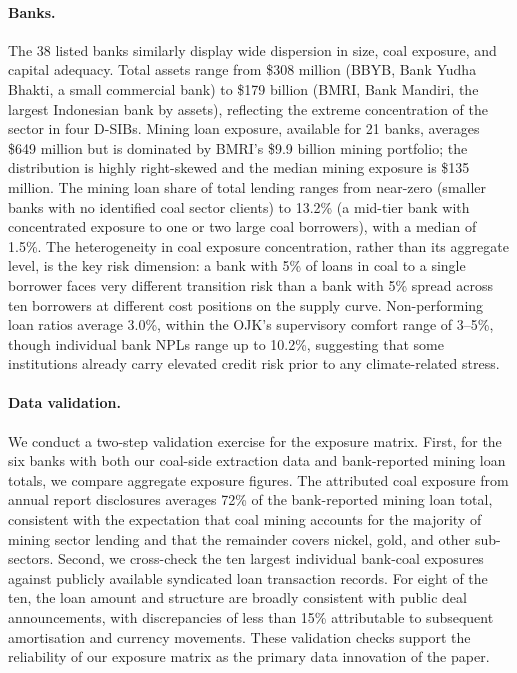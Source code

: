 \paragraph{Banks.} The 38 listed banks similarly display wide dispersion in size, coal exposure, and capital adequacy. Total assets range from \$308 million (BBYB, Bank Yudha Bhakti, a small commercial bank) to \$179 billion (BMRI, Bank Mandiri, the largest Indonesian bank by assets), reflecting the extreme concentration of the sector in four D-SIBs. Mining loan exposure, available for 21 banks, averages \$649 million but is dominated by BMRI's \$9.9 billion mining portfolio; the distribution is highly right-skewed and the median mining exposure is \$135 million. The mining loan share of total lending ranges from near-zero (smaller banks with no identified coal sector clients) to 13.2\% (a mid-tier bank with concentrated exposure to one or two large coal borrowers), with a median of 1.5\%. The heterogeneity in coal exposure concentration, rather than its aggregate level, is the key risk dimension: a bank with 5\% of loans in coal to a single borrower faces very different transition risk than a bank with 5\% spread across ten borrowers at different cost positions on the supply curve. Non-performing loan ratios average 3.0\%, within the OJK's supervisory comfort range of 3--5\%, though individual bank NPLs range up to 10.2\%, suggesting that some institutions already carry elevated credit risk prior to any climate-related stress.

\paragraph{Data validation.} We conduct a two-step validation exercise for the exposure matrix. First, for the six banks with both our coal-side extraction data and bank-reported mining loan totals, we compare aggregate exposure figures. The attributed coal exposure from annual report disclosures averages 72\% of the bank-reported mining loan total, consistent with the expectation that coal mining accounts for the majority of mining sector lending and that the remainder covers nickel, gold, and other sub-sectors. Second, we cross-check the ten largest individual bank-coal exposures against publicly available syndicated loan transaction records. For eight of the ten, the loan amount and structure are broadly consistent with public deal announcements, with discrepancies of less than 15\% attributable to subsequent amortisation and currency movements. These validation checks support the reliability of our exposure matrix as the primary data innovation of the paper.

